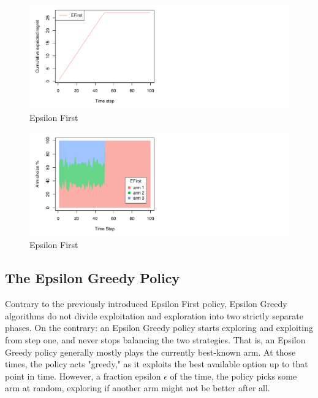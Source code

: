 \documentclass[nojss]{jss}\usepackage[]{graphicx}\usepackage[]{color}
\makeatletter
\def\maxwidth{ %
  \ifdim\Gin@nat@width>\linewidth
    \linewidth
  \else
    \Gin@nat@width
  \fi
}
\newenvironment{knitrout}{}{} %
\makeatother
\begin{document}
\begin{center}
\begin{knitrout}
\color{fgcolor}\begin{figure}[H]
\includegraphics[width=\maxwidth,]{fig/efpolicy-1} \caption[Epsilon First]{Epsilon First}\label{fig:efpolicy1}
\end{figure}

\begin{figure}[H]
\includegraphics[width=\maxwidth,]{fig/efpolicy-2} \caption[Epsilon First]{Epsilon First}\label{fig:efpolicy2}
\end{figure}


\end{knitrout}
\end{center}


\subsection{The Epsilon Greedy Policy}

Contrary to the previously introduced Epsilon First policy, Epsilon Greedy algorithms do not divide exploitation and exploration into two strictly separate phases. On the contrary: an Epsilon Greedy policy starts exploring and exploiting from step one, and never stops balancing the two strategies. That is, an Epsilon Greedy policy generally mostly plays the currently best-known arm. At those times, the policy acts "greedy," as it exploits the best available option up to that point in time. However, a fraction epsilon $\epsilon$ of the time, the policy picks some arm at random, exploring if another arm might not be better after all.
\end{document}
